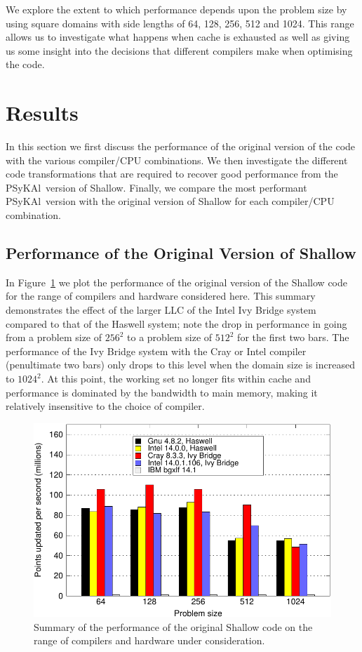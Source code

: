 \documentclass{IOS-Book-Article}
\newcommand{\psykal}{{PS}y{KA}l}
\begin{document}
We explore the extent to which performance depends upon the problem
size by using square domains with side lengths of 64, 128, 256, 512 and
1024. This range allows us to investigate what happens when cache is
exhausted as well as giving us some insight into the decisions that
different compilers make when optimising the code.

\section{Results}

In this section we first discuss the performance of the original
version of the code with the various compiler/CPU combinations. We
then investigate the different code transformations that are required
to recover good performance from the \psykal\ version of Shallow. Finally,
we compare the most performant \psykal\ version  with the original
version of Shallow for each compiler/CPU combination.

\subsection{Performance of the Original Version of Shallow}

In Figure~\ref{FIG_orig_perf_summary} we plot the performance of the
original version of the Shallow code for the range of compilers and
hardware considered here. This summary demonstrates the effect of the
larger LLC of the Intel Ivy Bridge system compared to
that of the Haswell system; note the drop in performance
in going from a problem size of $256^{2}$ to a problem size of
$512^{2}$ for the first two bars. The performance of the Ivy
Bridge system with the Cray or Intel compiler (penultimate two bars)
only drops to this level when the domain size is increased to
$1024^{2}$. At this point, the working set no longer fits within cache
and performance is dominated by the bandwidth to main memory, making
it relatively insensitive to the choice of compiler.

\begin{figure}[!t]
\centering
\includegraphics[width=120mm]{orig_summary}
\caption{Summary of the performance of the original Shallow code on
  the range of compilers and hardware under consideration.}
\label{FIG_orig_perf_summary}
\end{figure}
\end{document}
